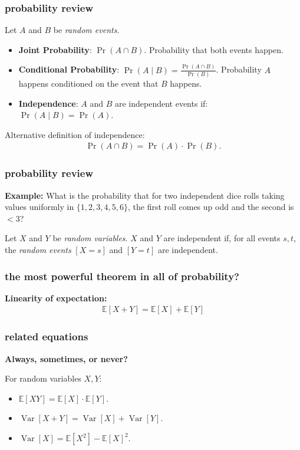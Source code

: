 \documentclass[]{beamer}
\newcommand{\E}{\mathbb{E}}
\DeclareMathOperator{\Var}{Var}
\begin{document}
	\begin{frame}
		\frametitle{probability review}
		Let $A$ and $B$ be \emph{random events}. 
		\begin{itemize}
			\item \textbf{Joint Probability}: \hspace{1em} $\Pr(A\cap B)$. Probability that both events happen.
			\item \textbf{Conditional Probability}: \hspace{1em}$\Pr(A\mid B) = \frac{\Pr(A\cap B)}{\Pr(B)}$. Probability $A$ happens conditioned on the event that $B$ happens.
			\item \textbf{Independence}: \hspace{1em} $A$ and $B$ are independent events if:
			$\Pr(A\mid B) = \Pr(A)$. 
		\end{itemize}
		Alternative definition of independence:
		\begin{align*}
			\Pr(A\cap B)  = \Pr(A)\cdot \Pr(B).
		\end{align*}
	\end{frame}
	
	\begin{frame}
		\frametitle{probability review}
		\textbf{Example:} What is the probability that for two independent dice rolls taking values uniformly in $\{1,2,3,4,5,6\}$, the first roll comes up odd and the second is $< 3$?
		
		\vspace{3em}
		Let $X$ and $Y$ be \emph{random variables}. $X$ and $Y$ are independent if, for all events $s, t$, the \emph{random events} $[X = s]$ and $[Y = t]$ are independent.
	\end{frame}
	
	\begin{frame}
		\frametitle{the most powerful theorem in all of probability?}
		\textbf{Linearity of expectation:}
		\begin{align*}
			\E[X + Y] = \E[X] + \E[Y]
		\end{align*}
		\vspace{4em}
	\end{frame}
	
	\begin{frame}
		\frametitle{related equations}
		\begin{center}
			\textbf{Always, sometimes, or never?}
		\end{center}
		
		For random variables $X,Y$:
		\begin{itemize}
			\item $\E[XY] = \E[X]\cdot\E[Y]$. 
			\vspace{2em}
			\item $\Var[X + Y] = \Var[X] + \Var[Y]$. 
			\vspace{2em}
			\item $\Var[X] = \E[X^2] - \E[X]^2$.
		\end{itemize}
	\end{frame}
	
\end{document}
